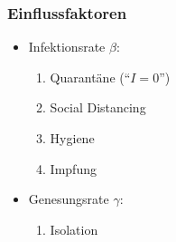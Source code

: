 %
%
%
\begin{frame}
\frametitle{Einflussfaktoren}

\begin{itemize}
\item Infektionsrate $\beta$:
\begin{enumerate}
\item<2-> Quarantäne (``$I=0$'')
\item<3-> Social Distancing 
\item<5-> Hygiene
\item<7-> Impfung
\end{enumerate}
\item Genesungsrate $\gamma$:
\begin{enumerate}
\item<9-> Isolation
\end{enumerate}
\end{itemize}
\end{frame}
